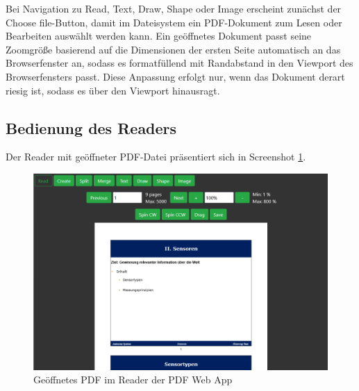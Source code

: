 Bei Navigation zu Read, Text, Draw, Shape oder Image erscheint zunächst der Choose file-Button, damit im Dateisystem ein PDF-Dokument zum Lesen oder Bearbeiten auswählt werden kann. Ein geöffnetes Dokument passt seine Zoomgröße basierend auf die Dimensionen der ersten Seite automatisch an das Browserfenster an, sodass es formatfüllend mit Randabstand in den Viewport des Browserfensters passt. Diese Anpassung erfolgt nur, wenn das Dokument derart riesig ist, sodass es über den Viewport hinausragt.

\subsection{Bedienung des Readers}
Der Reader mit geöffneter PDF-Datei präsentiert sich in Screenshot \ref{fig:reader}.

\begin{figure}[!htbp]
	\centering
	\includegraphics[width=1\textwidth]{"images/reader.png"}
	\caption{Geöffnetes PDF im Reader der PDF Web App}
	\label{fig:reader}
\end{figure}

